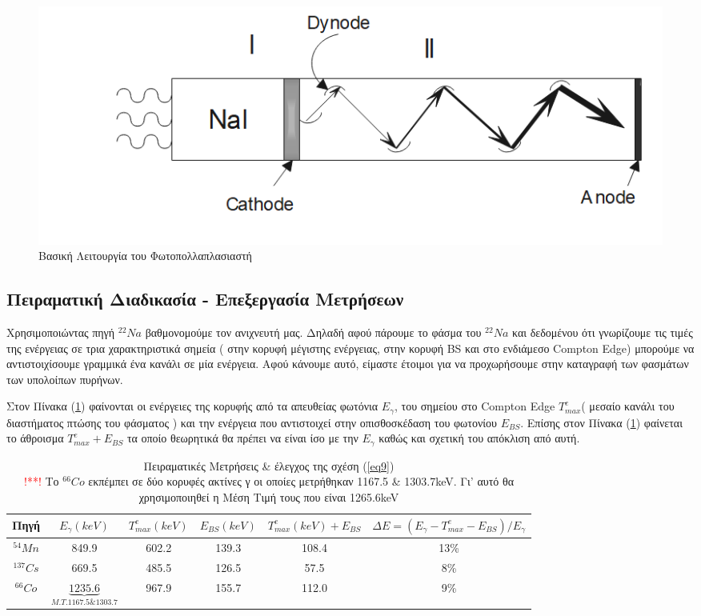 \documentclass[a4paper]{article}
\begin{document}
	\begin{figure}[h!]
		\centering
		\includegraphics[scale=0.5]{ph_mult.png}	
		\caption{Βασική Λειτουργία του Φωτοπολλαπλασιαστή}
		\label{fig2}
	\end{figure}			
	
\subsection*{Πειραματική Διαδικασία - Επεξεργασία Μετρήσεων}
	Χρησιμοποιώντας πηγή $^{22}Na$ βαθμονομούμε τον ανιχνευτή μας. Δηλαδή αφού πάρουμε το φάσμα του $^{22}Na$ και δεδομένου ότι γνωρίζουμε τις τιμές της ενέργειας σε τρια χαρακτηριστικά σημεία ( στην κορυφή μέγιστης ενέργειας, στην κορυφή BS και στο ενδιάμεσο Compton Edge) μπορούμε να αντιστοιχίσουμε γραμμικά ένα κανάλι σε μία ενέργεια.
	Αφού κάνουμε αυτό, είμαστε έτοιμοι για να προχωρήσουμε στην καταγραφή των φασμάτων των υπολοίπων πυρήνων. 
	
	Στον Πίνακα (\ref{mat1}) φαίνονται οι ενέργειες της κορυφής από τα απευθείας φωτόνια $E_\gamma$, του σημείου στο Compton Edge $T^e_{max}$( μεσαίο κανάλι του διαστήματος πτώσης του φάσματος ) και την ενέργεια που αντιστοιχεί στην οπισθοσκέδαση του φωτονίου $E_{BS}$.
	Επίσης στον Πίνακα (\ref{mat1}) φαίνεται το άθροισμα $T^e_{max} + E_{BS}$ τα οποίο θεωρητικά θα πρέπει να είναι ίσο με την $E_\gamma $ καθώς και σχετική του απόκλιση από αυτή.
	
	\begin{table}[h!]
		\centering 
		\begin{tabular}{c|c|c|c||c|c}
			Πηγή       & $E_\gamma(keV)$  &  $T^e_{max}(keV)$  & $E_{BS}(keV)$ & $T^e_{max}(keV)+E_{BS}$  & $\Delta E = (E_\gamma - T^e_{max}-E_{BS})/E_\gamma$ \\\hline 
			$^{54}Mn$  & 849.9             &     602.2     & 139.3 & 108.4& 13\%\\  
			$^{137}Cs$ & 669.5             &     485.5     & 126.5 & 57.5&8\%\\ 
			$^{66}Co $ & $\underbrace{1235.6}_{M.Τ. 1167.5 \& 1303.7}$ &     967.9     & 155.7 & 112.0 & 9\% \\ 
		\end{tabular}
		\caption{Πειραματικές Μετρήσεις \& έλεγχος της σχέση (\ref{eq9})\\ \textcolor{red}{!**!} Το $^{66}Co$ εκπέμπει σε δύο κορυφές ακτίνες γ οι οποίες μετρήθηκαν 1167.5 \& 1303.7keV. Γι' αυτό θα χρησιμοποιηθεί η Μέση Τιμή τους που είναι 1265.6keV}
		\label{mat1}
	\end{table}
	
\end{document}
